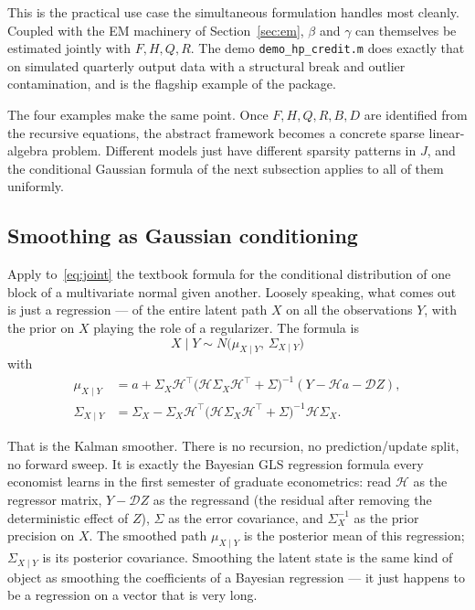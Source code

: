 \documentclass[11pt]{article}
\begin{document}
This is the practical use case the simultaneous formulation handles
most cleanly.  Coupled with the EM machinery of
Section~\ref{sec:em}, $\beta$ and $\gamma$ can themselves be
estimated jointly with $F,H,Q,R$.  The demo
\texttt{demo\_hp\_credit.m} does exactly that on simulated quarterly
output data with a structural break and outlier contamination, and is
the flagship example of the package.

The four examples make the same point.  Once $F,H,Q,R,B,D$ are
identified from the recursive equations, the abstract framework
becomes a concrete sparse linear-algebra problem.  Different models
just have different sparsity patterns in $J$, and the conditional
Gaussian formula of the next subsection applies to all of them
uniformly.

\subsection{Smoothing as Gaussian conditioning}

Apply to~\eqref{eq:joint} the textbook formula for the conditional
distribution of one block of a multivariate normal given another.
Loosely speaking, what comes out is just a regression --- of the entire
latent path $X$ on all the observations $Y$, with the prior on $X$
playing the role of a regularizer.  The formula is
\begin{equation}
X\mid Y\sim N\bigl(\mu_{X\mid Y},\,\Sigma_{X\mid Y}\bigr)
\end{equation}
with
\begin{align}
\mu_{X\mid Y} &= a+\Sigma_X\mathcal H^\top
   \bigl(\mathcal H\Sigma_X\mathcal H^\top+\Sigma\bigr)^{-1}(Y-\mathcal Ha-\mathcal D Z),
\label{eq:smooth-mean}\\[2pt]
\Sigma_{X\mid Y} &= \Sigma_X-\Sigma_X\mathcal H^\top
   \bigl(\mathcal H\Sigma_X\mathcal H^\top+\Sigma\bigr)^{-1}
   \mathcal H\Sigma_X.
\label{eq:smooth-cov}
\end{align}

That is the Kalman smoother.  There is no recursion, no
prediction/update split, no forward sweep.  It is exactly the Bayesian
GLS regression formula every economist learns in the first semester of
graduate econometrics: read $\mathcal H$ as the regressor matrix, $Y-\mathcal D Z$
as the regressand (the residual after removing the deterministic
effect of $Z$), $\Sigma$ as the error covariance, and $\Sigma_X^{-1}$
as the prior precision on $X$.  The smoothed path $\mu_{X\mid Y}$ is
the posterior mean of this regression; $\Sigma_{X\mid Y}$ is its
posterior covariance.  Smoothing the latent state is the same kind of
object as smoothing the coefficients of a Bayesian regression --- it
just happens to be a regression on a vector that is very long.
\end{document}
